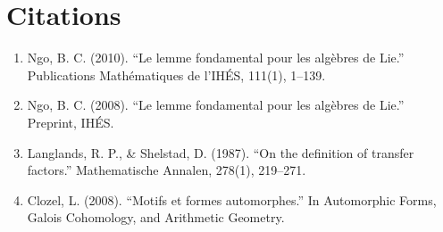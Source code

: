 \section{Citations}

\begin{enumerate}
\item Ngo, B. C. (2010). ``Le lemme fondamental pour les alg\`ebres de Lie.'' Publications Math\'ematiques de l'IH\'ES, 111(1), 1--139.
\item Ngo, B. C. (2008). ``Le lemme fondamental pour les alg\`ebres de Lie.'' Preprint, IH\'ES.
\item Langlands, R. P., \& Shelstad, D. (1987). ``On the definition of transfer factors.'' Mathematische Annalen, 278(1), 219--271.
\item Clozel, L. (2008). ``Motifs et formes automorphes.'' In Automorphic Forms, Galois Cohomology, and Arithmetic Geometry.
\end{enumerate}

